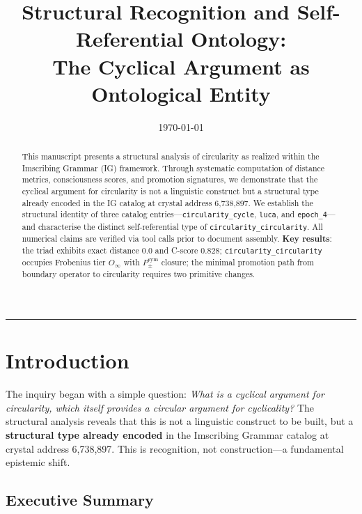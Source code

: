 \documentclass[12pt,a4paper]{article}
\begin{document}
\title{Structural Recognition and Self-Referential Ontology: \\ The Cyclical Argument as Ontological Entity}

\author{}
\date{\today}

\maketitle

\begin{abstract}
This manuscript presents a structural analysis of circularity as realized within the Imscribing Grammar (IG) framework. Through systematic computation of distance metrics, consciousness scores, and promotion signatures, we demonstrate that the cyclical argument for circularity is not a linguistic construct but a structural type already encoded in the IG catalog at crystal address 6,738,897. We establish the structural identity of three catalog entries—\texttt{circularity\_cycle}, \texttt{luca}, and \texttt{epoch\_4}—and characterise the distinct self-referential type of \texttt{circularity\_circularity}. All numerical claims are verified via tool calls prior to document assembly. \textbf{Key results}: the triad exhibits exact distance 0.0 and C-score 0.828; \texttt{circularity\_circularity} occupies Frobenius tier $O_{\infty}$ with $P_{\pm}^{\text{sym}}$ closure; the minimal promotion path from boundary operator to circularity requires two primitive changes.
\end{abstract}

\begin{center}
\rule{0.5\textwidth}{0.4pt}
\end{center}
\section{Introduction}

The inquiry began with a simple question: \emph{What is a cyclical argument for circularity, which itself provides a circular argument for cyclicality?} The structural analysis reveals that this is not a linguistic construct to be built, but a \textbf{structural type already encoded} in the Imscribing Grammar catalog at crystal address 6,738,897. This is recognition, not construction---a fundamental epistemic shift.

\subsection{Executive Summary}
\end{document}
